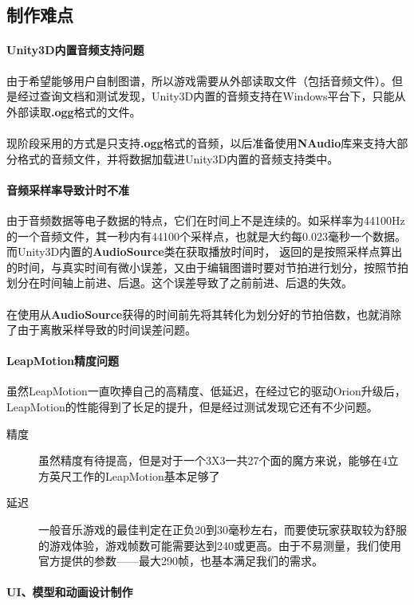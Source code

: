 \documentclass{article}
\begin{document}
\subsection{制作难点}
\paragraph{Unity3D内置音频支持问题}
由于希望能够用户自制图谱，所以游戏需要从外部读取文件（包括音频文件）。但是经过查询文档和测试发现，Unity3D内置的音频支持在Windows平台下，只能从外部读取\textbf{.ogg}格式的文件。
\paragraph{}
现阶段采用的方式是只支持\textbf{.ogg}格式的音频，以后准备使用\textbf{NAudio}库来支持大部分格式的音频文件，并将数据加载进Unity3D内置的音频支持类中。
\paragraph{音频采样率导致计时不准}
由于音频数据等电子数据的特点，它们在时间上不是连续的。如采样率为44100Hz的一个音频文件，其一秒内有44100个采样点，也就是大约每0.023毫秒一个数据。而Unity3D内置的\textbf{AudioSource}类在获取播放时间时，
返回的是按照采样点算出的时间，与真实时间有微小误差，又由于编辑图谱时要对节拍进行划分，按照节拍划分在时间轴上前进、后退。这个误差导致了之前前进、后退的失效。
\paragraph{}
在使用从\textbf{AudioSource}获得的时间前先将其转化为划分好的节拍倍数，也就消除了由于离散采样导致的时间误差问题。
\paragraph{LeapMotion精度问题}
虽然LeapMotion一直吹捧自己的高精度、低延迟，在经过它的驱动Orion升级后，LeapMotion的性能得到了长足的提升，但是经过测试发现它还有不少问题。
\begin{description}
  \item[精度] 虽然精度有待提高，但是对于一个3X3一共27个面的魔方来说，能够在4立方英尺工作的LeapMotion基本足够了
  \item[延迟] 一般音乐游戏的最佳判定在正负20到30毫秒左右，而要使玩家获取较为舒服的游戏体验，游戏帧数可能需要达到240或更高。由于不易测量，我们使用官方提供的参数——最大290帧，也基本满足我们的需求。
\end{description}
\paragraph{UI、模型和动画设计制作}
\end{document}
